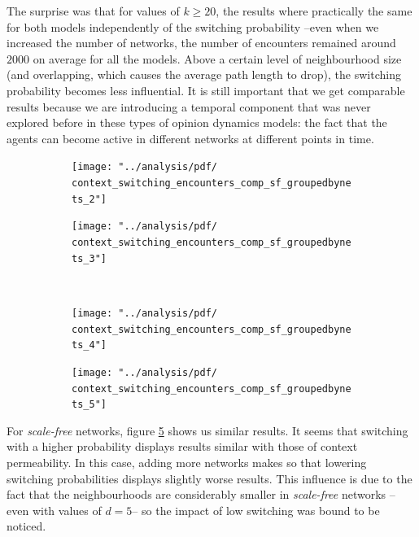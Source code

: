 \documentclass[preprint,number]{elsarticle}
\begin{document}
The surprise was that for values of $k \ge 20$, the results where practically the same for both models independently of the switching probability --even when we increased the number of networks, the number of encounters remained around $2000$ on average for all the models. Above a certain level of neighbourhood size (and overlapping, which causes the average path length to drop), the switching probability becomes less influential. It is still important that we get comparable results because we are introducing a temporal component that was never explored before in these types of opinion dynamics models: the fact that the agents can become active in different networks at different points in time.


\begin{figure}[H]
	\centering
	\begin{subfigure}{.49\linewidth}
		\centering
		\texttt{[image: "../analysis/pdf/ context\_switching\_encounters\_comp\_sf\_groupedbynets\_2"]}
		\caption{}
		\label{fig:ctx_switching_comp_sf_2}
	\end{subfigure}%
	\begin{subfigure}{.5\linewidth}
		\centering
		\texttt{[image: "../analysis/pdf/ context\_switching\_encounters\_comp\_sf\_groupedbynets\_3"]}
		\caption{}
		\label{fig:ctx_switching_comp_sf_3}
	\end{subfigure}\\
	\begin{subfigure}{.49\linewidth}
		\centering
		\texttt{[image: "../analysis/pdf/ context\_switching\_encounters\_comp\_sf\_groupedbynets\_4"]}
		\caption{}
		\label{fig:ctx_switching_comp_sf_4}
	\end{subfigure}
	\begin{subfigure}{.5\linewidth}
		\centering
		\texttt{[image: "../analysis/pdf/ context\_switching\_encounters\_comp\_sf\_groupedbynets\_5"]}
		\caption{}
		\label{fig:ctx_switching_comp_sf_5}
	\end{subfigure}
	\begin{minipage}{0.9\textwidth}
		\vspace{0.2cm}
		\caption{}
		\label{fig:ctx_switching_comp_sf}
	\end{minipage}
\end{figure}

For \textit{scale-free} networks, figure \ref{fig:ctx_switching_comp_sf} shows us similar results. It seems that switching with a higher probability displays results similar with those of context permeability. In this case, adding more networks makes so that lowering switching probabilities displays slightly worse results. This influence is due to the fact that the neighbourhoods are considerably smaller in \textit{scale-free} networks --even with values of $d=5$-- so the impact of low switching was bound to be noticed.
\end{document}
